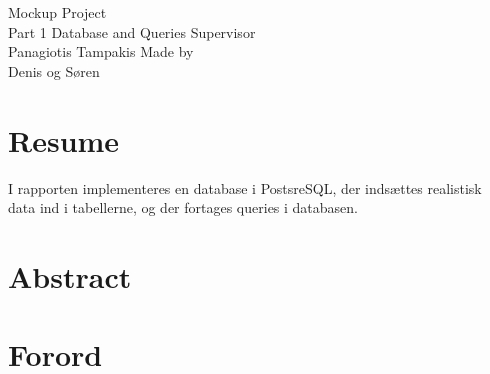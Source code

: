 \documentclass{article}
\begin{document}
\begin{titlepage}
    \vfill
    \clearpage\thispagestyle{empty}
    \centering
    {\Large Mockup Project }\vspace{0.5cm} \\
    {Part 1 Database and Queries}
    \vfill
    {Supervisor}\\
    {Panagiotis Tampakis}
    \vfill
    {Made by}\\
    {Denis og Søren\\}
    \vskip6cm
\end{titlepage}

\section*{Resume}
I rapporten implementeres en database i PostsreSQL, der indsættes realistisk data ind i tabellerne,
og der fortages queries i databasen.


\section*{Abstract}

\newpage
\section*{Forord}

\clearpage
\tableofcontents
\newpage


\newpage



% 

% 
\end{document}

